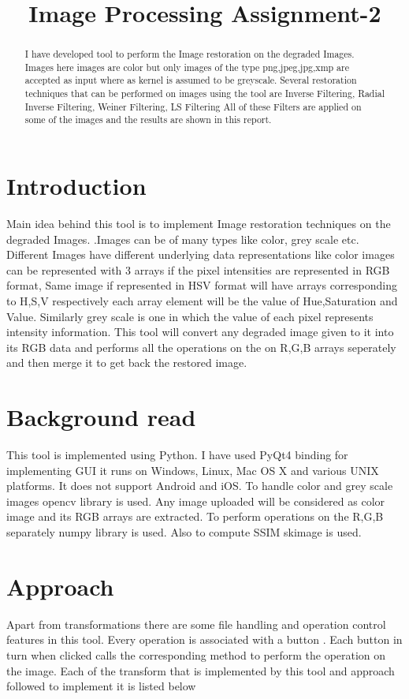 \documentclass{article}
\title{Image Processing Assignment-2}
\begin{document}
%
\maketitle
%
\begin{abstract}
I have developed tool to perform the Image restoration on the degraded Images. Images here images are color but only images of the type png,jpeg,jpg,xmp are accepted as input where as kernel is assumed to be greyscale. Several restoration techniques that can be performed on  images using the tool are Inverse Filtering, Radial Inverse Filtering, Weiner Filtering, LS Filtering All of these Filters are applied on some of the images and the results are shown in this report.
\end{abstract}

\section{Introduction}
\label{sec:intro}
Main idea behind this tool is to implement Image restoration techniques on the degraded Images.  .Images can be of many types like color, grey scale etc. Different Images have different underlying data representations like color images can be represented with 3 arrays if the pixel intensities are represented in RGB format, Same image if represented in HSV format will have arrays corresponding to H,S,V respectively each array element will be the value of Hue,Saturation and Value. Similarly grey scale  is one in which the value of each pixel represents intensity information. This tool will convert any degraded image given to it into its RGB data and performs all the operations on the on R,G,B arrays seperately and then merge it  to get back the restored image.


\section{Background read}
\label{sec:format}
This tool is implemented using Python\cite{WEBSITE:10}. I have used PyQt4\cite{WEBSITE:9} binding for implementing GUI it runs on Windows, Linux, Mac OS X and various UNIX platforms. It does not support Android and iOS. To handle color and grey scale images opencv\cite{WEBSITE:4} library is used. Any image uploaded will be considered as color image and its RGB arrays\cite{WEBSITE:2} are extracted. To perform operations on the R,G,B separately  numpy\cite{WEBSITE:1} library is used. Also to compute SSIM skimage is used.


\section{Approach}
\label{sec:pagestyle}
Apart from transformations there are some file handling and operation control features in this tool. Every operation is associated with a button . Each button in turn when clicked calls the corresponding method to perform the operation on the image.  Each of the transform that is implemented by this tool and approach followed to implement it is listed below
\end{document}
